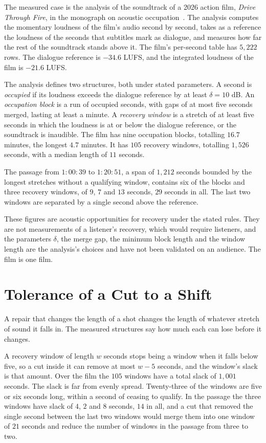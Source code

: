 \documentclass[11pt,twoside,openright]{book}
\theoremstyle{plain}
\theoremstyle{definition}
\theoremstyle{remark}
\begin{document}
The measured case is the analysis of the soundtrack of a 2026 action film, \emph{Drive Through Fire}, in the monograph on acoustic occupation~\cite{flyxion2026ao}. The analysis computes the momentary loudness of the film's audio second by second, takes as a reference the loudness of the seconds that subtitles mark as dialogue, and measures how far the rest of the soundtrack stands above it. The film's per-second table has $5{,}222$ rows. The dialogue reference is $-34.6$ LUFS, and the integrated loudness of the film is $-21.6$ LUFS.

The analysis defines two structures, both under stated parameters. A second is \emph{occupied} if its loudness exceeds the dialogue reference by at least $\delta=10$ dB. An \emph{occupation block} is a run of occupied seconds, with gaps of at most five seconds merged, lasting at least a minute. A \emph{recovery window} is a stretch of at least five seconds in which the loudness is at or below the dialogue reference, or the soundtrack is inaudible. The film has nine occupation blocks, totalling $16.7$ minutes, the longest $4.7$ minutes. It has $105$ recovery windows, totalling $1{,}526$ seconds, with a median length of $11$ seconds.

The passage from $1{:}00{:}39$ to $1{:}20{:}51$, a span of $1{,}212$ seconds bounded by the longest stretches without a qualifying window, contains six of the blocks and three recovery windows, of $9$, $7$ and $13$ seconds, $29$ seconds in all. The last two windows are separated by a single second above the reference.

These figures are acoustic opportunities for recovery under the stated rules. They are not measurements of a listener's recovery, which would require listeners, and the parameters $\delta$, the merge gap, the minimum block length and the window length are the analysis's choices and have not been validated on an audience. The film is one film.

\section{Tolerance of a Cut to a Shift}\label{sec:tolerance}

A repair that changes the length of a shot changes the length of whatever stretch of sound it falls in. The measured structures say how much each can lose before it changes.

A recovery window of length $w$ seconds stops being a window when it falls below five, so a cut inside it can remove at most $w-5$ seconds, and the window's slack is that amount. Over the film the $105$ windows have a total slack of $1{,}001$ seconds. The slack is far from evenly spread. Twenty-three of the windows are five or six seconds long, within a second of ceasing to qualify. In the passage the three windows have slack of $4$, $2$ and $8$ seconds, $14$ in all, and a cut that removed the single second between the last two windows would merge them into one window of $21$ seconds and reduce the number of windows in the passage from three to two.
\end{document}
